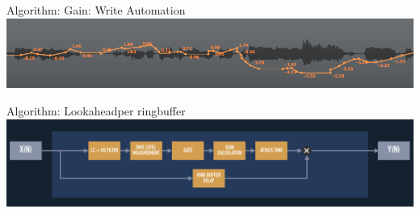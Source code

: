\begin{frame}[fragile]{Algorithm: Gain: Write Automation}{}
	\includegraphics[scale=0.365]{images/automation}
	\centering
\end{frame}

\begin{frame}[c]{Algorithm: Lookahead}{per ringbuffer}
	\includegraphics[scale=0.32]{images/lookahead}
	\centering
	\\
\end{frame}